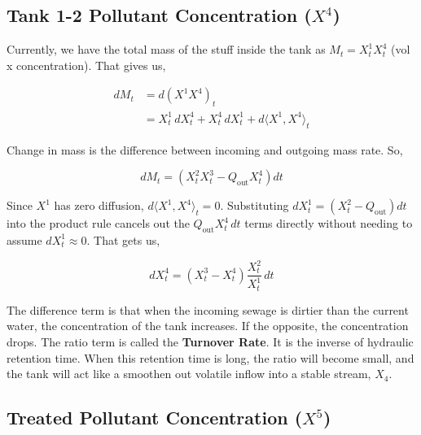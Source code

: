\documentclass[conference]{IEEEtran}
\renewcommand{\medskip}{\vspace{1\baselineskip}}
\renewcommand{\smallskip}{\vspace{0.5\baselineskip}}
\theoremstyle{definitionsc}
\theoremstyle{plainsc}
\theoremstyle{remarksc}
\begin{document}
\medskip





\subsection{\textbf{Tank 1-2 Pollutant Concentration ($X^4$)}}

Currently, we have the total mass of the stuff inside the tank as $M_t = X_t^1 X_t^4$ (vol x concentration). That gives us,

\begin{align*}
	dM_t &= d(X^1 X^4)_t\\
	&= X_t^1\,dX_t^4 + X_t^4\,dX_t^1 + d\langle X^1, X^4 \rangle_t
\end{align*}

Change in mass is the difference between incoming and outgoing mass rate. So,

\begin{equation*}
	dM_t = \left( X_t^2 X_t^3 - Q_{\text{out}} X_t^4 \right) dt
\end{equation*}

Since $X^1$ has zero diffusion, $d\langle X^1, X^4 \rangle_t = 0$. Substituting $dX_t^1 = (X_t^2 - Q_{\text{out}})dt$ into the product rule cancels out the $Q_{\text{out}} X_t^4\,dt$ terms directly without needing to assume $dX_t^1 \approx 0$. That gets us,

\begin{equation}
\label{eq:Xt4}
	dX_t^4 = (X_t^3 - X_t^4) \frac{X_t^2}{X_t^1}\,dt
\end{equation}



\smallskip

The difference term is that when the incoming sewage is dirtier than the current water, the concentration of the tank increases. If the opposite, the concentration drops. The ratio term is called the \textbf{Turnover Rate}. It is the inverse of hydraulic retention time. When this retention time is long, the ratio will become small, and the tank will act like a smoothen out volatile inflow into a stable stream, $X_4$.




\medskip






\subsection{\textbf{Treated Pollutant Concentration ($X^5$)}}
\end{document}
